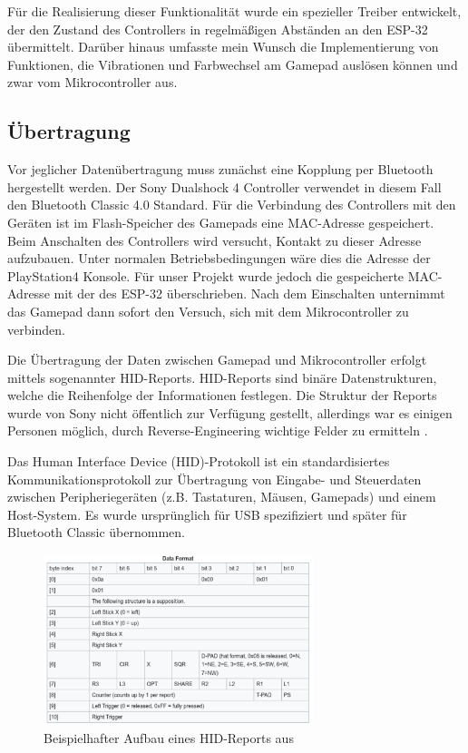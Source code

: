 Für die Realisierung dieser Funktionalität wurde ein spezieller Treiber entwickelt, der den Zustand des Controllers in regelmäßigen Abständen an den ESP-32 übermittelt. 
Darüber hinaus umfasste mein Wunsch die Implementierung von Funktionen, die Vibrationen und Farbwechsel am Gamepad auslösen können und zwar vom Mikrocontroller aus.

\subsection{Übertragung}

Vor jeglicher Datenübertragung muss zunächst eine Kopplung per Bluetooth hergestellt werden. 
Der Sony Dualshock 4 Controller verwendet in diesem Fall den Bluetooth Classic 4.0 Standard.
Für die Verbindung des Controllers mit den Geräten ist im Flash-Speicher des Gamepads eine MAC-Adresse gespeichert. 
Beim Anschalten des Controllers wird versucht, Kontakt zu dieser Adresse aufzubauen.
Unter normalen Betriebsbedingungen wäre dies die Adresse der PlayStation4 Konsole. 
Für unser Projekt wurde jedoch die gespeicherte MAC-Adresse mit der des ESP-32 überschrieben.
Nach dem Einschalten unternimmt das Gamepad dann sofort den Versuch, sich mit dem Mikrocontroller zu verbinden.

Die Übertragung der Daten zwischen Gamepad und Mikrocontroller erfolgt mittels sogenannter HID-Reports.
HID-Reports sind binäre Datenstrukturen, welche die Reihenfolge der Informationen festlegen.
Die Struktur der Reports wurde von Sony nicht öffentlich zur Verfügung gestellt, allerdings war es einigen Personen möglich, durch Reverse-Engineering wichtige Felder zu ermitteln \cite{esp_ds4_hid_reports}.

Das Human Interface Device (HID)-Protokoll ist ein standardisiertes Kommunikationsprotokoll zur Übertragung von Eingabe- und Steuerdaten zwischen Peripheriegeräten (z.B. Tastaturen, Mäusen, Gamepads) und einem Host-System. 
Es wurde ursprünglich für USB spezifiziert \cite{esp_usb_hid_spec} und später für Bluetooth Classic übernommen.

\begin{figure}[ht]
    \centering
    \includegraphics[width=0.7\textwidth]{images/becker_esp32_ds4_report.png}
    \caption{Beispielhafter Aufbau eines HID-Reports aus \cite{esp_ds4_hid_reports}}
\end{figure}

